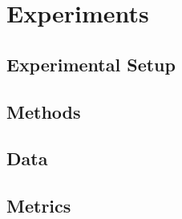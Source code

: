 \chapter{Experiments}\label{chap:experiments}

\section{Experimental Setup}\label{sec:experimental-setup}

\section{Methods}\label{sec:experimental-methods}



\section{Data}\label{sec:data}


\section{Metrics}\label{sec:metrics}

